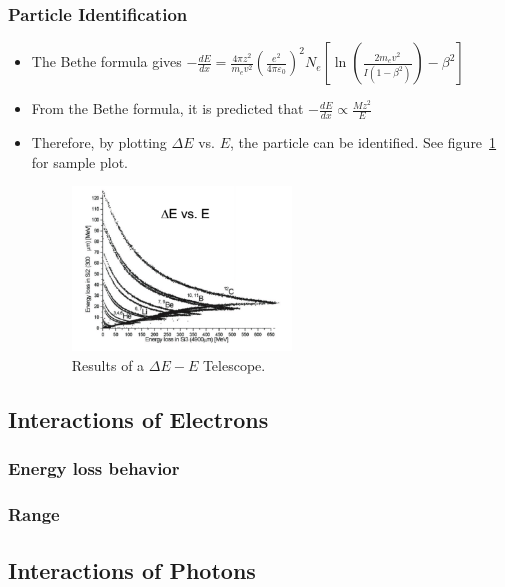\subsubsection{Particle Identification}
\begin{itemize}
    \item The Bethe formula gives $-\frac{dE}{dx}=\frac{4\pi z^2}{m_ev^2}\left(\frac{e^2}{4\pi\varepsilon_0}\right)^2N_e\left[\ln\left(\frac{2m_ev^2}{I(1-\beta^2)}\right)-\beta^2\right]$
    \item From the Bethe formula, it is predicted that $-\frac{dE}{dx}\propto \frac{Mz^2}{E}$
    \item Therefore, by plotting $\Delta E$ vs. $E$, the particle can be identified. See figure~\ref{fig:DeltaE_E_telescope} for sample plot.
    \begin{figure}
        \centering
        \includegraphics[width=0.55\textwidth]{images/DeltaE_E_telescope.png}
        \caption{Results of a $\Delta E-E$ Telescope.}
        \label{fig:DeltaE_E_telescope}
    \end{figure}
\end{itemize}

\subsection{Interactions of Electrons}

\subsubsection{Energy loss behavior}

\subsubsection{Range}

\subsection{Interactions of Photons}
